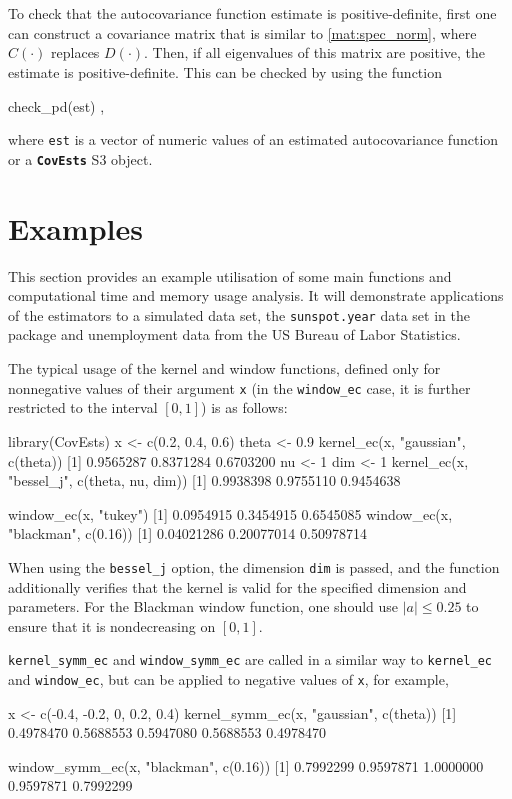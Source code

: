 To check that the autocovariance function estimate is positive-definite, first one can construct a covariance matrix that is similar to \eqref{mat:spec_norm}, where \(\widehat{C}(\cdot)\) replaces \(D(\cdot).\)
Then, if all eigenvalues of this matrix are positive, the estimate is positive-definite.
This can be checked by using the function
\begin{example}
check_pd(est) ,
\end{example}
where \texttt{est} is a vector of numeric values of an estimated autocovariance function or a \textbf{\texttt{CovEsts}} S3 object.

\section{Examples} \label{sec:examples}
This section provides an example utilisation of some main functions and computational time and memory usage analysis. It will demonstrate applications of the estimators to a simulated data set, the \texttt{sunspot.year} data set in the  package and unemployment data from the US Bureau of Labor Statistics.

The typical usage of the kernel and window functions, defined only for nonnegative values of their argument \texttt{x} (in the \texttt{window\_ec} case, it is further restricted to the interval \([0, 1]\)) is as follows:
\begin{example}
library(CovEsts)
x <- c(0.2, 0.4, 0.6)
theta <- 0.9
kernel_ec(x, "gaussian", c(theta))
[1] 0.9565287 0.8371284 0.6703200
nu <- 1
dim <- 1
kernel_ec(x, "bessel_j", c(theta, nu, dim))
[1] 0.9938398 0.9755110 0.9454638

window_ec(x, "tukey")
[1] 0.0954915 0.3454915 0.6545085
window_ec(x, "blackman", c(0.16))
[1] 0.04021286 0.20077014 0.50978714
\end{example}
When using the \texttt{bessel\_j} option, the dimension \texttt{dim} is passed, and the function additionally verifies that the kernel is valid for the specified dimension and parameters.
For the Blackman window function, one should use \(\left| a \right| \leq 0.25\) to ensure that it is nondecreasing on \([0, 1].\)

\texttt{kernel\_symm\_ec} and \texttt{window\_symm\_ec} are called in a similar way to \texttt{kernel\_ec} and \texttt{window\_ec}, but can be applied to negative values of \texttt{x}, for example,
\begin{example}
x <- c(-0.4, -0.2, 0, 0.2, 0.4)
kernel_symm_ec(x, "gaussian", c(theta))
[1] 0.4978470 0.5688553 0.5947080 0.5688553 0.4978470

window_symm_ec(x, "blackman", c(0.16))
[1] 0.7992299 0.9597871 1.0000000 0.9597871 0.7992299
\end{example}

